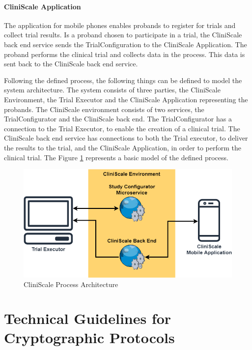 \paragraph{CliniScale Application} The application for mobile phones enables probands to register for trials and collect trial results. Is a proband chosen to participate in a trial, the CliniScale back end service sends the TrialConfiguration to the CliniScale Application. The proband performs the clinical trial and collects data in the process. This data is sent back to the CliniScale back end service.

Following the defined process, the following things can be defined to model the system architecture. The system consists of three parties, the CliniScale Environment, the Trial Executor and the CliniScale Application representing the probands. The CliniScale environment consists of two services, the TrialConfigurator and the CliniScale back end. The TrialConfigurator has a connection to the Trial Executor, to enable the creation of a clinical trial. The CliniScale back end service has connections to both the Trial executor, to deliver the results to the trial, and the CliniScale Application, in order to perform the clinical trial. The Figure \ref{fig:cliniscalesystem} represents a basic model of the defined process.

\begin{figure}[H]
  \includegraphics[width=\linewidth]{images/cs-flowchart.png}
  \caption{CliniScale Process Architecture}
  \label{fig:cliniscalesystem}
\end{figure}


\section{Technical Guidelines for Cryptographic Protocols}
\label{cryptorequirements}

